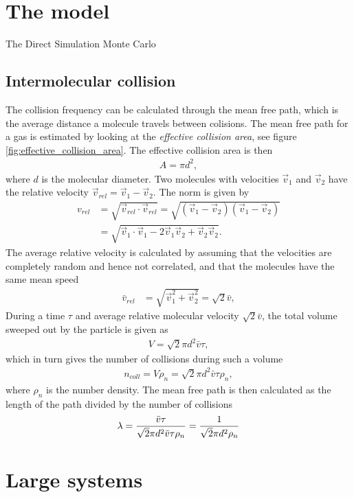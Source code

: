 \section{The model}
The Direct Simulation Monte Carlo
\subsection{Intermolecular collision}
The collision frequency can be calculated through the mean free path, which is the average distance a molecule travels between colisions. The mean free path for a gas is estimated by looking at the \textit{effective collision area}, see figure \ref{fig:effective_collision_area}. The effective collision area is then
\begin{align}
	A = \pi d^2,
\end{align}
where $d$ is the molecular diameter. Two molecules with velocities $\vec v_1$ and $\vec v_2$ have the relative velocity $\vec v_{rel} = \vec v_1 - \vec v_2$. The norm is given by
\begin{align}
	v_{rel} &= \sqrt{\vec v_{rel}\cdot \vec v_{rel} } = \sqrt{ (\vec v_1 - \vec v_2)(\vec v_1 - \vec v_2)}\\
	&= \sqrt{\vec v_1\cdot \vec v_1 - 2\vec v_1\vec v_2 + \vec v_2\vec v_2}.
\end{align}
The average relative velocity is calculated by assuming that the velocities are completely random and hence not correlated, and that the molecules have the same mean speed
\begin{align}
	\bar v_{rel} &= \sqrt{\vec v_1^2 + \vec v_2^2} = \sqrt 2 \bar v,
\end{align}
During a time $\tau$ and average relative molecular velocity $\sqrt 2 \bar v$, the total volume sweeped out by the particle is given as
\begin{align}
	V = \sqrt 2 \pi d^2\bar v \tau,
\end{align}
which in turn gives the number of collisions during such a volume
\begin{align}
	n_{coll} = V\rho_n = \sqrt 2 \pi d^2\bar v \tau \rho_n,
\end{align}
where $\rho_n$ is the number density. The mean free path is then calculated as the length of the path divided by the number of collisions
\begin{align}
	\lambda = {\bar v \tau\over \sqrt 2 \pi d^2\bar v \tau \rho_n} = {1 \over \sqrt 2 \pi d^2 \rho_n}
\end{align}
\section{Large systems}